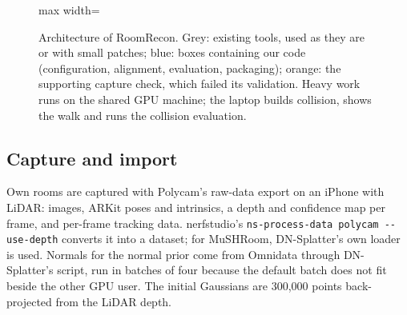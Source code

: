 \begin{figure}[!htb]
\begin{adjustbox}{max width=\linewidth}
\end{adjustbox}
\caption{Architecture of RoomRecon. Grey: existing tools, used as they are or with small patches; blue: boxes containing our code (configuration, alignment, evaluation, packaging); orange: the supporting capture check, which failed its validation. Heavy work runs on the shared GPU machine; the laptop builds collision, shows the walk and runs the collision evaluation.}
\label{fig:arch}
\end{figure}

\subsection{Capture and import}
Own rooms are captured with Polycam's raw-data export \cite{polycam} on an iPhone with LiDAR: images, ARKit poses and intrinsics, a depth and confidence map per frame, and per-frame tracking data. nerfstudio's \texttt{ns-process-data polycam -{}-use-depth} converts it into a dataset; for MuSHRoom, DN-Splatter's own loader is used. Normals for the normal prior come from Omnidata \cite{eftekhar2021omnidata} through DN-Splatter's script, run in batches of four because the default batch does not fit beside the other GPU user. The initial Gaussians are 300,000 points back-projected from the LiDAR depth.

